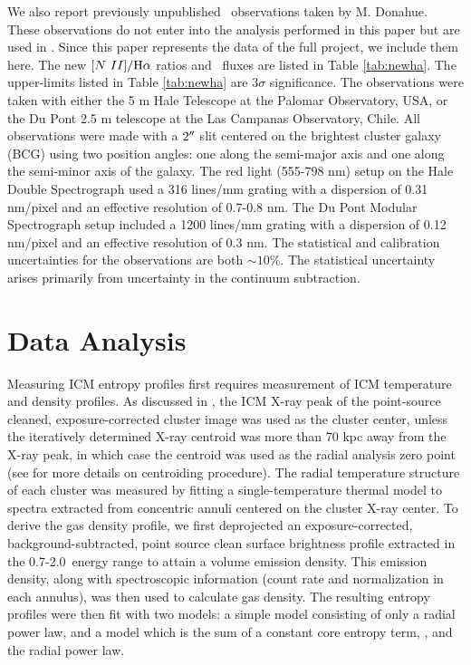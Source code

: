 \documentclass[12pt,preprint]{aastex}
\begin{document}
We also report previously unpublished \halpha\ observations taken by
M. Donahue. These observations do not enter into the analysis
performed in this paper but are used in \citet{haradent}. Since this
paper represents the data of the full project, we include them
here. The new $[N~II]/\mathrm{H}\alpha$ ratios and \halpha\ fluxes are listed
in Table \ref{tab:newha}. The upper-limits listed in Table
\ref{tab:newha} are $3\sigma$ significance. The observations were
taken with either the 5 m Hale Telescope at the Palomar Observatory,
USA, or the Du Pont 2.5 m telescope at the Las Campanas Observatory,
Chile. All observations were made with a $2\mathrm{^\prime}\hskip -0.1em\mathrm{^\prime}$ slit centered on the
brightest cluster galaxy (BCG) using two position angles: one along
the semi-major axis and one along the semi-minor axis of the
galaxy. The red light (555-798 nm) setup on the Hale Double
Spectrograph used a 316 lines/mm grating with a dispersion of 0.31
nm/pixel and an effective resolution of 0.7-0.8 nm. The Du Pont
Modular Spectrograph setup included a 1200 lines/mm grating with a
dispersion of 0.12 nm/pixel and an effective resolution of 0.3 nm. The
statistical and calibration uncertainties for the observations are
both $\sim 10\%$. The statistical uncertainty arises primarily from
uncertainty in the continuum subtraction.

\section{Data Analysis}
\label{sec:data}

Measuring ICM entropy profiles first requires measurement of ICM
temperature and density profiles. As discussed in \citet{xrayband},
the ICM X-ray peak of the point-source cleaned, exposure-corrected
cluster image was used as the cluster center, unless the iteratively
determined X-ray centroid was more than 70 kpc away from the X-ray
peak, in which case the centroid was used as the radial analysis
zero point (see \cite{xrayband} for more details on centroiding
procedure). The radial temperature structure of each cluster was
measured by fitting a single-temperature thermal model to spectra
extracted from concentric annuli centered on the cluster X-ray
center. To derive the gas density profile, we first deprojected an
exposure-corrected, background-subtracted, point source clean surface
brightness profile extracted in the 0.7-2.0\keV\ energy range to
attain a volume emission density. This emission density, along with
spectroscopic information (count rate and normalization in each
annulus), was then used to calculate gas density. The resulting
entropy profiles were then fit with two models: a simple model
consisting of only a radial power law, and a model which is the sum of
a constant core entropy term, \kna, and the radial power law.
\end{document}
